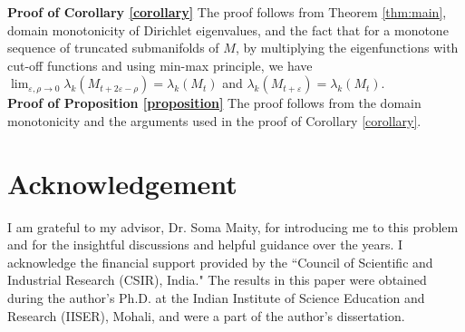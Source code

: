 \documentclass[10 pt, reqno]{amsart}
\newcommand{\lk}{\lambda_k}%
\theoremstyle{definition}
\numberwithin{equation}{section}
\begin{document}
\textbf{Proof of Corollary \ref{corollary}} The proof follows from Theorem \ref{thm:main}, domain monotonicity of Dirichlet eigenvalues, 
 and the fact that for a monotone sequence of truncated submanifolds of $M$, by multiplying the eigenfunctions with cut-off functions and using min-max principle, we have $\lim_{\varepsilon,\rho\to 0}\lk(M_{t+2\varepsilon-\rho})=\lk(M_t)$ and $\lk(M_{t+\varepsilon})=\lk(M_t)$.  \\

 \textbf{Proof of Proposition \ref{proposition}} The proof follows from the domain monotonicity and the arguments used in the proof of Corollary \ref{corollary}.







\section*{Acknowledgement}
I am grateful to my advisor, Dr. Soma Maity, for introducing me to this problem and for the insightful discussions and helpful guidance over the years. I acknowledge the financial support provided by the ``Council of Scientific and Industrial Research (CSIR), India." The results in this paper were obtained during the author’s Ph.D. at the Indian Institute of Science Education and Research (IISER), Mohali, and were a part of the author’s dissertation. 




\end{document}
